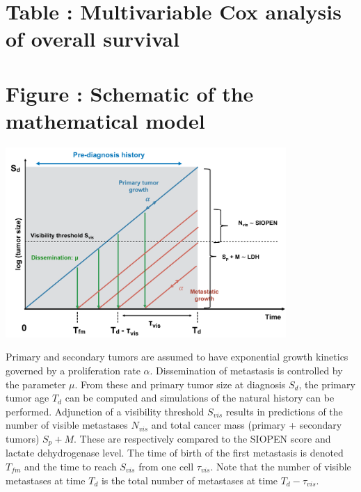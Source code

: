 \documentclass[11pt]{article}
\newcounter{fignb}  %
\newcounter{tabnb} %
\begin{document}
\newpage
{}
\section{Table : Multivariable Cox analysis of overall survival}
\spaceV
\begin{center}

\end{center}
\newpage
{}
\section{Figure : Schematic of the mathematical model}
\spaceV
\begin{center}
\includegraphics[width=0.8\textwidth]{figure_1}
\end{center}
Primary and secondary tumors are assumed to have exponential growth kinetics governed by a proliferation rate $\alpha$. Dissemination of metastasis is controlled by the parameter $\mu$. From these and primary tumor size at diagnosis $S_d$, the primary tumor age $T_d$ can be computed and simulations of the natural history can be performed. Adjunction of a visibility threshold $S_{vis}$ results in predictions of the number of visible metastases $N_{vis}$ and total cancer mass (primary + secondary tumors) $S_p + M$. These are respectively compared to the SIOPEN score and lactate dehydrogenase level. The time of birth of the first metastasis is denoted $T_{fm}$ and the time to reach $S_{vis}$ from one cell $\tau_{vis}$. Note that the number of visible metastases at time $T_d$ is the total number of metastases at time $T_d - \tau_{vis}$.
\newpage
{}
\end{document}
